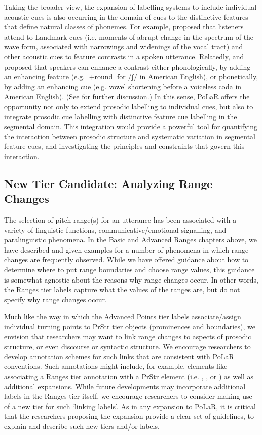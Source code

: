 \documentclass[11pt, twoside]{memoir}
\def\textlabel#1{{\relsize{-.5}\fontspec[Mapping=tex-text]{Roboto Mono}{#1}}}
\begin{document}
Taking the broader view,  the expansion of labelling systems to include individual acoustic cues is also occurring in the domain of cues to the distinctive features that define natural classes of phonemes.  For example, \citet{stevens02} proposed that listeners attend to Landmark cues (i.e. moments of abrupt change in the spectrum of the wave form, associated with narrowings and widenings of the vocal tract) and other acoustic cues to feature contrasts in a spoken utterance.  Relatedly, \citet{stevenskeyser89} and \citet{keyserstevens01} proposed that speakers can enhance a contrast either phonologically, by adding an enhancing feature (e.g. [+round] for /ʃ/ in American English), or phonetically, by adding an enhancing cue (e.g. vowel shortening before a voiceless coda in American English).  (See \citealt{clements09} for further discussion.)   In this sense, PoLaR offers the opportunity not only to extend prosodic labelling to individual cues, but also to integrate prosodic cue labelling with distinctive feature cue labelling in the segmental domain.  This integration would provide a powerful tool for quantifying the interaction between prosodic structure and systematic variation in segmental feature cues, and investigating the principles and constraints that govern this interaction.  

\subsection{New Tier Candidate: Analyzing Range Changes}\label{sec:new-tier-range-changes}
The selection of pitch range(s) for an utterance has been associated with a variety of linguistic functions, communicative\slash emotional signalling, and paralinguistic phenomena. In the Basic and Advanced Ranges chapters above, we have described and given examples for a number of phenomena in which range changes are frequently observed.  While we have offered guidance about how to determine where to put range boundaries and choose range values, this guidance is somewhat agnostic about the reasons why range changes occur. In other words, the Ranges tier labels capture what the values of the ranges are, but do not specify why range changes occur. 

Much like the way in which the Advanced Points tier labels associate\slash assign individual turning points to PrStr tier objects (prominences and boundaries), we envision that researchers may want to link range changes to aspects of prosodic structure, or even discourse or syntactic structure. We encourage researchers to develop annotation schemes for such links that are consistent with PoLaR conventions. Such annotations might include, for example, elements like associating a Ranges tier annotation with a PrStr element (i.e. \textlabel{*}, \textlabel{[}, or \textlabel{]}) as well as additional expansions. While future developments may incorporate additional labels in the Ranges tier itself, we encourage researchers to consider making use of a new tier for such ‘linking labels’. As in any expansion to PoLaR, it is critical that the researchers proposing the expansion provide a clear set of guidelines, to explain and describe such new tiers and/or labels.
\end{document}
